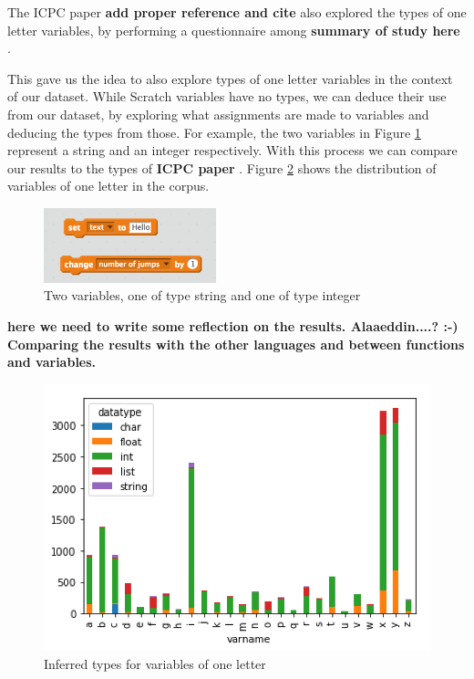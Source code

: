 \documentclass[conference]{IEEEtran}
\newcommand{\todo}[1]{ \textbf{#1} }
\begin{document}
The ICPC paper \todo{add proper reference and cite} also explored the types of one letter variables, by performing a questionnaire among \todo{summary of study here}.

This gave us the idea to also explore types of one letter variables in the context of our dataset. While Scratch variables have no types, we can deduce their use from our dataset, by exploring what assignments are made to variables and deducing the types from those. For example, the two variables in Figure \ref{fig:types} represent a string and an integer respectively. With this process we can compare our results to the types of \todo{ICPC paper}. 
Figure \ref{fig:one_letter_type} shows the distribution of variables of one letter in the corpus.

\begin{figure}
	\begin{center}
		\includegraphics[width=5cm]{fig/types}
		\caption{Two variables, one of type string and one of type integer}
		\label{fig:types}
	\end{center}
\end{figure} 

\todo{here we need to write some reflection on the results. Alaaeddin....? :-) Comparing the results with the other languages and between functions and variables.}

\begin{figure}
	\begin{center}
		\includegraphics[width=\columnwidth]{fig/one_letter_type}
		\caption{Inferred types for variables of one letter}
		\label{fig:one_letter_type}
	\end{center}
\end{figure} 
\end{document}
